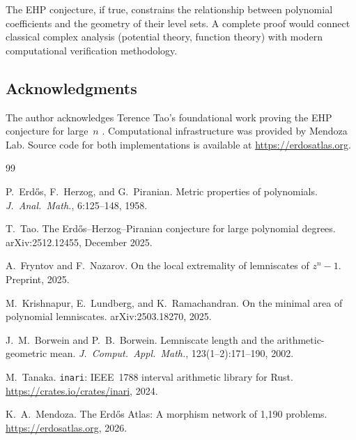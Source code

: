 \documentclass[11pt]{article}
\theoremstyle{plain}
\theoremstyle{definition}
\theoremstyle{remark}
\begin{document}
The EHP conjecture, if true, constrains the relationship between polynomial coefficients and the geometry of their level sets. A complete proof would connect classical complex analysis (potential theory, function theory) with modern computational verification methodology.

\subsection*{Acknowledgments}

The author acknowledges Terence Tao's foundational work proving the EHP conjecture for large~$n$ \cite{Tao2025}. Computational infrastructure was provided by Mendoza Lab. Source code for both implementations is available at \url{https://erdosatlas.org}.

\begin{thebibliography}{99}

P.~Erd\H{o}s, F.~Herzog, and G.~Piranian.
Metric properties of polynomials.
\emph{J.~Anal.~Math.}, 6:125--148, 1958.

T.~Tao.
The Erd\H{o}s--Herzog--Piranian conjecture for large polynomial degrees.
arXiv:2512.12455, December 2025.

A.~Fryntov and F.~Nazarov.
On the local extremality of lemniscates of $z^n - 1$.
Preprint, 2025.

M.~Krishnapur, E.~Lundberg, and K.~Ramachandran.
On the minimal area of polynomial lemniscates.
arXiv:2503.18270, 2025.

J.~M.~Borwein and P.~B.~Borwein.
Lemniscate length and the arithmetic-geometric mean.
\emph{J.~Comput.~Appl.~Math.}, 123(1--2):171--190, 2002.

M.~Tanaka.
\texttt{inari}: IEEE~1788 interval arithmetic library for Rust.
\url{https://crates.io/crates/inari}, 2024.

K.~A.~Mendoza.
The Erd\H{o}s Atlas: A morphism network of 1,190 problems.
\url{https://erdosatlas.org}, 2026.

\end{thebibliography}
\end{document}
